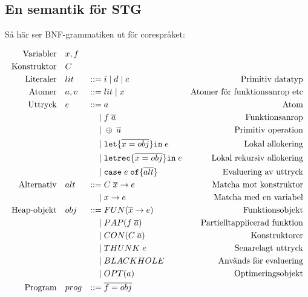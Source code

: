\documentclass[../Core]{subfiles}
\begin{document}
\subsection{En semantik för STG}
\label{sec:SemStg}






Så här ser BNF-grammatiken ut för corespråket:


\begin{equation*}
\begin{aligned}
\text{Variabler} \quad & x,f \\
\text{Konstruktor} \quad & C \\
\text{Literaler}\quad&lit&::=&\;i \; | \;  d \;|\; c&\text{Primitiv datatyp} \\
\text{Atomer}\quad&a, v&::=&\;lit \; | \; x&\text{Atomer för funktionsanrop etc} \\
\text{Uttryck}\quad&e&::=&\;a&\text{Atom} \\
    &&|&\;f \; \overline{a}&\text{Funktionsanrop} \\
    &&|&\;\oplus \; \overline{a}&\text{Primitiv operation} \\
    &&|&\;\mathtt{let \{} \overline{x = obj} \mathtt{ \} in } \; e&\text{Lokal allokering} \\
    &&|&\;\mathtt{letrec \{} \overline{x = obj} \mathtt{ \} in } \; e&\text{Lokal rekursiv allokering} \\
    &&|&\;\mathtt{case} \; e \;  \mathtt{ of \{ } \overline{alt} \mathtt{\}}&\text{Evaluering av uttryck} \\
\text{Alternativ}\quad&alt&::=&\;C \; \overline{x} \rightarrow e&\text{Matcha mot konstruktor} \\
    &&|&\;x \rightarrow e&\text{Matcha med en variabel} \\
\text{Heap-objekt}\quad&obj&::=&\;FUN(\overline{x} \rightarrow e)&\text{Funktionsobjekt} \\
    &&|&\;PAP(f \; \overline{a})&\text{Partielltapplicerad funktion} \\
    &&|&\;CON(C \; \overline{a})&\text{Konstruktorer} \\
    &&|&\;THUNK \; e&\text{Senarelagt uttryck} \\
    &&|&\;BLACKHOLE&\text{Används för evaluering} \\
    &&|&\;OPT(a)&\text{Optimeringsobjekt} \\
\text{Program}\quad&prog&::=&\;\overline{f=obj}&\text{}
\end{aligned}
\end{equation*}
\end{document}
